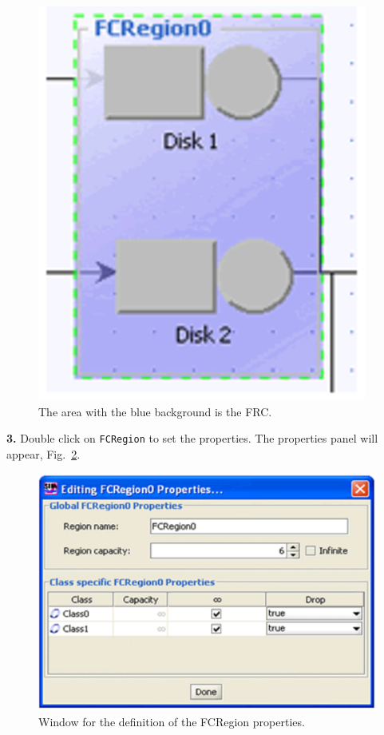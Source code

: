\begin{figure}[h]
    \begin{center}
        \includegraphics[scale=.5]{img/jsimg/8.2.eps}
    \end{center}
    \caption{The area with the blue background is the FRC.}
    \label{fig:selfcrblueback}
\end{figure}
\textbf{3.}  Double click on \texttt{FCRegion} to set the
properties. The properties panel will appear,
Fig.~\ref{fig:fcrdefprop}.
\begin{figure}[h!]
    \begin{center}
        \includegraphics[scale=.5]{img/jsimg/8.3.eps}
    \end{center}
    \caption{Window for the definition of the FCRegion properties.}
    \label{fig:fcrdefprop}
\end{figure}

